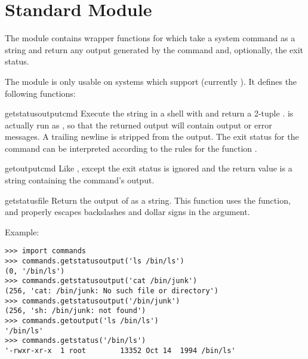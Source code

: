 \section{Standard Module }
\label{module-commands}

The  module contains wrapper functions for
 which take a system command as a string and
return any output generated by the command and, optionally, the exit
status.

The  module is only usable on systems which support 
 (currently \UNIX{}).  It defines the following
functions:


\begin{funcdesc}{getstatusoutput}{cmd}
Execute the string  in a shell with  and
return a 2-tuple .   is
actually run as , so that the returned
output will contain output or error messages. A trailing newline is
stripped from the output. The exit status for the command can be
interpreted according to the rules for the \C{} function
.
\end{funcdesc}

\begin{funcdesc}{getoutput}{cmd}
Like , except the exit status is ignored
and the return value is a string containing the command's output.  
\end{funcdesc}

\begin{funcdesc}{getstatus}{file}
Return the output of  as a string.  This
function uses the  function, and properly
escapes backslashes and dollar signs in the argument.
\end{funcdesc}

Example:

\begin{verbatim}
>>> import commands
>>> commands.getstatusoutput('ls /bin/ls')
(0, '/bin/ls')
>>> commands.getstatusoutput('cat /bin/junk')
(256, 'cat: /bin/junk: No such file or directory')
>>> commands.getstatusoutput('/bin/junk')
(256, 'sh: /bin/junk: not found')
>>> commands.getoutput('ls /bin/ls')
'/bin/ls'
>>> commands.getstatus('/bin/ls')
'-rwxr-xr-x  1 root        13352 Oct 14  1994 /bin/ls'
\end{verbatim}
